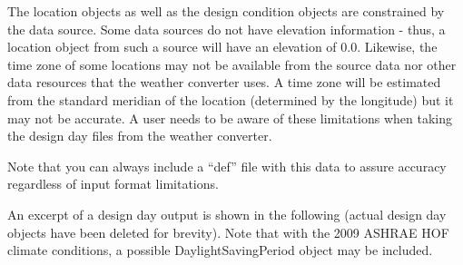 The location objects as well as the design condition objects are constrained by the data source. Some data sources do not have elevation information - thus, a location object from such a source will have an elevation of 0.0. Likewise, the time zone of some locations may not be available from the source data nor other data resources that the weather converter uses. A time zone will be estimated from the standard meridian of the location (determined by the longitude) but it may not be accurate. A user needs to be aware of these limitations when taking the design day files from the weather converter.

Note that you can always include a ``def'' file with this data to assure accuracy regardless of input format limitations.

An excerpt of a design day output is shown in the following (actual design day objects have been deleted for brevity). Note that with the 2009 ASHRAE HOF climate conditions, a possible DaylightSavingPeriod object may be included.

